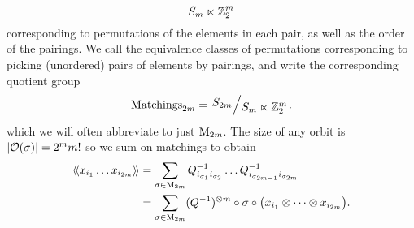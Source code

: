 \begin{equation*}
  S_m \ltimes \mathbb{Z}_2^m
\end{equation*}
corresponding to permutations of the elements in each pair, as well as the order of the pairings. We call the equivalence classes of permutations corresponding to picking (unordered) pairs of elements by pairings, and write the corresponding quotient group
\begin{equation*}
  \text{Matchings}_{2m} = \bigslant{S_{2m}}{S_m \ltimes \Zbb_2^m}.
\end{equation*}
which we will often abbreviate to just $\mathrm{M}_{2m}$. The size of any orbit is $| \mathcal{O} (\sigma) | = 2^m m!$ so we sum on matchings to obtain
\begin{align*}
  \langle \! \langle {x_{i_1} \dots x_{i_{2m}}} \rangle \! \rangle
  &= \sum_{\sigma \in \mathrm{M}_{2m}}
  Q_{i_{\sigma_1} i_{\sigma_2}}^{-1} \dots Q_{i_{\sigma_{2m-1}} i_{\sigma_{2m}}}^{-1} \\
  &= \sum_{\sigma \in \mathrm{M}_{2m}} (Q^{-1})^{\otimes m} \circ \sigma \circ \bigl(x_{i_1} \otimes \dots \otimes x_{i_{2m}}\bigr).
\end{align*}

